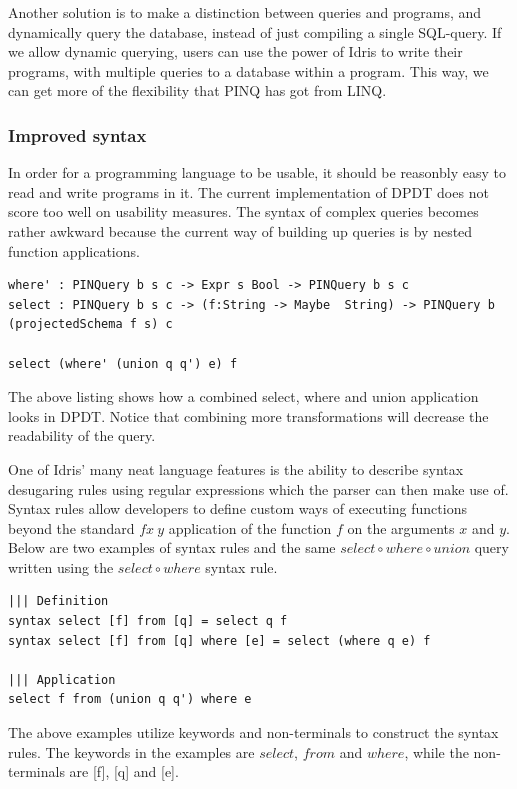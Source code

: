 \documentclass[12pt]{article}
\begin{document}
Another solution is to make a distinction between queries and programs, and dynamically query the database, instead of just compiling a single SQL-query.
If we allow dynamic querying, users can use the power of Idris to write their programs, with multiple queries to a database within a program.
This way, we can get more of the flexibility that PINQ has got from LINQ. 

\subsubsection{Improved syntax}

In order for a programming language to be usable, it should be reasonbly easy to read and write programs in it.
The current implementation of DPDT does not score too well on usability measures.
The syntax of complex queries becomes rather awkward because the current way of building up queries is by nested function applications.

\begin{lstlisting}
where' : PINQuery b s c -> Expr s Bool -> PINQuery b s c
select : PINQuery b s c -> (f:String -> Maybe  String) -> PINQuery b (projectedSchema f s) c

select (where' (union q q') e) f
\end{lstlisting}

The above listing shows how a combined select, where and union application looks in DPDT.
Notice that combining more transformations will decrease the readability of the query.

One of Idris' many neat language features is the ability to describe syntax desugaring rules using regular expressions which the parser can then make use of.
Syntax rules allow developers to define custom ways of executing functions beyond the standard $f x \: y$ application of the function $f$ on the arguments $x$ and $y$.
Below are two examples of syntax rules and the same $select \circ where \circ union$ query written using the $select \circ where$ syntax rule.

\begin{lstlisting}
||| Definition
syntax select [f] from [q] = select q f
syntax select [f] from [q] where [e] = select (where q e) f

||| Application
select f from (union q q') where e
\end{lstlisting}

The above examples utilize keywords and non-terminals to construct the syntax rules.
The keywords in the examples are $select$, $from$ and $where$, while the non-terminals are [f], [q] and [e].
\end{document}
